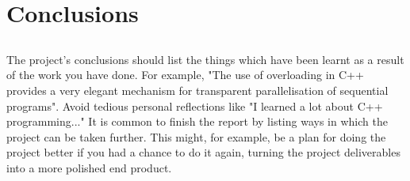 \chapter{Conclusions}\label{chap:conclusions}

\section*{}
The project's conclusions should list the things which have been learnt as a result of the work you have done. For example, "The use of overloading in C++ provides a very elegant mechanism for transparent parallelisation of sequential programs". Avoid tedious personal reflections like "I learned a lot about C++ programming..." It is common to finish the report by listing ways in which the project can be taken further. This might, for example, be a plan for doing the project better if you had a chance to do it again, turning the project deliverables into a more polished end product.


